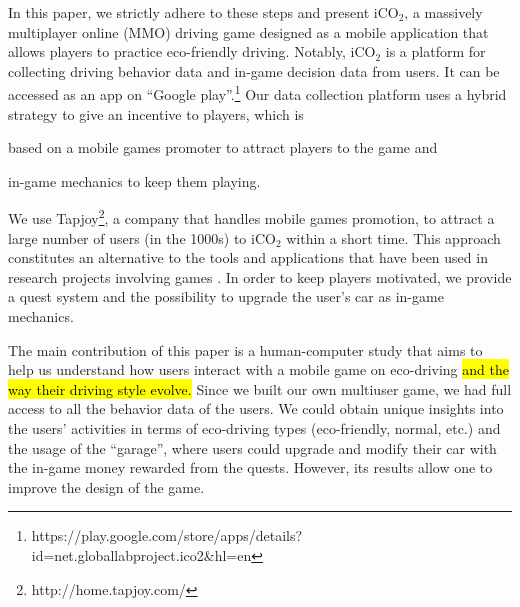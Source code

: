 \documentclass[preprint,authoryear,12pt]{elsarticle}
\newcommand{\hlc}[2][yellow]{ {\sethlcolor{#1} \hl{#2}} }
\newcommand{\commentShow}[1] {} %
\begin{document}
In this paper, we strictly adhere to these steps and present iCO$_2$, a massively multiplayer online (MMO) driving game designed as a mobile application that allows players to practice eco-friendly driving. Notably, iCO$_2$ is a platform for collecting driving behavior data and in-game decision data from users. It can be accessed as an app on ``Google play''.\footnote{https://play.google.com/store/apps/details?id=net.globallabproject.ico2\&hl=en}
Our data collection platform uses a hybrid strategy to give an incentive to players, which is \begin{inparaenum} \item based on a mobile games promoter to attract players to the game and \item in-game mechanics to keep them playing. \end{inparaenum} We use Tapjoy\footnote{http://home.tapjoy.com/}, %
a company that handles mobile games promotion, to attract a large number of users (in the 1000s) to iCO$_2$ within a short time. This approach constitutes an alternative to the tools and applications that have been used in research projects involving games \citep{kittur2008crowdsourcing,Biewald:2012,ChanH12}.
In order to keep players motivated, we provide a quest system and the possibility to upgrade the user's car as in-game mechanics.

The main contribution of this paper is a human-computer study that aims to help us understand how users interact with a mobile game on eco-driving
\hlc[green]{and the way their driving style evolve.}
Since we built our own multiuser game, we had full access to all the behavior data of the users. We could obtain unique insights into the users' activities in terms of eco-driving types (eco-friendly, normal, etc.) and the usage of the ``garage'', where users could upgrade and modify their car with the in-game money rewarded from the quests. \commentShow{The definition of quest is not given before this. }  However, its results allow one to improve the design of the game. \commentShow{How the results have improved the in-game design ? There is discussion of that. }

\end{document}
